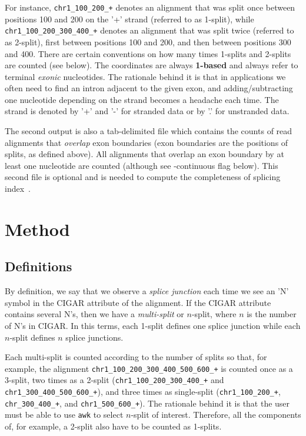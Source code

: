 \documentclass{article}
\begin{document}
For instance, {\tt chr1\_100\_200\_+} denotes an alignment that was split once between positions 100 and 200 on the '+' 
strand (referred to as 1-split), while {\tt chr1\_100\_200\_300\_400\_+} denotes an alignment that was split twice 
(referred to as 2-split), first between positions 100 and 200, and then between positions 300 and 400. There are certain 
conventions on how many times 1-splits and 2-splits are counted (see below). The coordinates are always {\bf 1-based} 
and always refer to terminal {\em exonic} nucleotides. The rationale behind it is that in applications we often need to
find an intron adjacent to the given exon, and adding/subtracting one nucleotide depending on the strand becomes a headache 
each time. The strand is denoted by '+' and '-' for stranded data or by '.' for unstranded data.

The second output is also a tab-delimited file which contains the counts of read alignments that {\em overlap} exon 
boundaries (exon boundaries are the positions of splits, as defined above). All alignments that overlap an exon boundary 
by at least one nucleotide are counted (although see -continuous flag below). This second file is optional and is needed 
to compute the completeness of splicing index~\cite{pmid23172860, pmid22955974}.

\section{Method}
\subsection{Definitions}
By definition, we say that we observe a {\em splice junction} each time we see an 'N' symbol in the CIGAR attribute 
of the alignment. If the CIGAR attribute contains several N's, then we have a {\em multi-split} or $n$-split, where $n$ 
is the number of N's in CIGAR. In this terms, each 1-split defines one splice junction while each $n$-split defines
$n$ splice junctions. 

Each multi-split is counted according to the number of splits so that, for example, the 
alignment {\tt chr1\_100\_200\_300\_400\_500\_600\_+} is counted once as a 3-split, two times 
as a 2-split ({\tt chr1\_100\_200\_300\_400\_+} and {\tt chr1\_300\_400\_500\_600\_+}), and three times 
as single-split ({\tt chr1\_100\_200\_+}, {\tt chr\_300\_400\_+}, and {\tt chr1\_500\_600\_+}). The rationale behind 
it is that the user must be able to use {\tt awk} to select $n$-split of interest. Therefore, all the components of,
for example, a 2-split also have to be counted as 1-splits.
\end{document}
